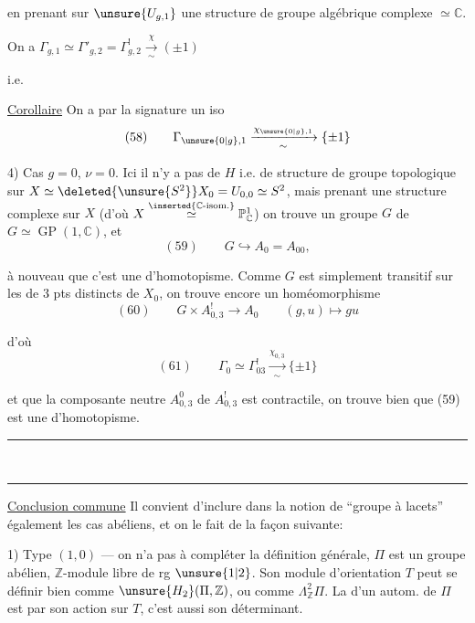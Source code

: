 en prenant sur $\unsure{U_{g,1}}$ une structure de groupe algébrique complexe $\simeq\mathbb{C}$.

On a $\Gamma_{g,1}\simeq\Gamma'_{g,2}=\Gamma^!_{g,2}\xrightarrow[\sim]{\chi}(\pm1)$

i.e.

\uline{Corollaire} On a par la signature un iso
\[
(58)\qquad\Gamma_{\unsure{0|g},1}\xrightarrow[\sim]{\chi_{\unsure{0|g},1}}\{\pm1\}
\]

4) Cas $g=0$, $\nu=0$. Ici il n'y a pas de $H$ i.e. de structure de groupe topologique sur $X\simeq\deleted{\unsure{S^2}}X_0=U_{0,0}\simeq S^2$, mais prenant une structure complexe sur $X$ (d'où $X\overset{\inserted{\mathbb{C}\text{-isom.}}}{\simeq}\mathbb{P}^1_{\mathbb{C}}$) on trouve un groupe $G$ de   $G\simeq\operatorname{GP}(1,\mathbb{C})$, et
\[
(59)\qquad G\hookrightarrow A_0=A_{00},
\]

 à nouveau que c'est une  d'homotopisme. Comme $G$ est simplement transitif sur les   de $3$ pts distincts de $X_0$, on trouve encore un homéomorphisme
\[
(60)\qquad G\times A^!_{0,3}\longrightarrow A_0\qquad(g,u)\longmapsto gu
\]

d'où
\[
(61)\qquad\Gamma_0\simeq\Gamma^!_{03}\xrightarrow[\sim]{\chi_{0,3}}\{\pm1\}
\]

et  que la composante neutre $A^0_{0,3}$ de $A^!_{0,3}$ est contractile, on trouve bien  que (59) est une  d'homotopisme.
\begin{center}\rule{1.2cm}{0.25pt}\\[-0.8em]\rule{1.2cm}{0.25pt}\end{center}

\uline{Conclusion commune}  Il convient d'inclure dans la notion de ``groupe à lacets'' également les  cas abéliens, et on le fait de la façon suivante:

1) Type $(1,0)$ --- on n'a pas à compléter la définition générale,  $\Pi$ est un groupe abélien, $\mathbb{Z}$-module libre de rg $\unsure{1|2}$. Son module d'orientation $T$ peut se définir bien comme $\unsure{H_2}(\Pi,\mathbb{Z})$, ou comme $\Lambda^2_{\mathbb{Z}}\Pi$. La   d'un autom. de $\Pi$ est  par son action sur $T$, c'est aussi son déterminant.

